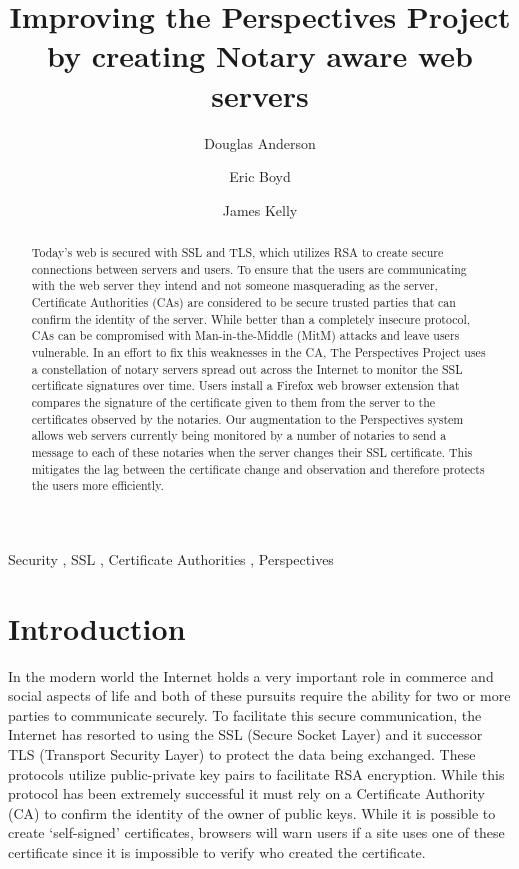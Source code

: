\documentclass[preprint,review,12pt]{elsarticle}
\begin{document}
\begin{frontmatter}

\title{Improving the Perspectives Project by creating Notary aware web servers}

\author[doug]{Douglas Anderson}
\author[eric]{Eric Boyd}
\author[james]{James Kelly}
\address[doug]{dander01@uoguelph.ca}
\address[eric]{boyde@uoguelph.ca}
\address[james]{kellyj@uoguelph.ca}


\begin{abstract}

Today's web is secured with SSL and TLS, which utilizes RSA to create secure
connections between servers and users. To ensure that the users are
communicating with the web server they intend and not someone masquerading as
the server, Certificate Authorities (CAs) are considered to be secure trusted
parties that can confirm the identity of the server. While better than a
completely insecure protocol, CAs can be compromised with Man-in-the-Middle
(MitM) attacks and leave users vulnerable. In an effort to fix this weaknesses
in the CA, The Perspectives Project uses a constellation of notary servers
spread out across the Internet to monitor the SSL certificate signatures over
time. Users install a Firefox web browser extension that compares the signature of the
certificate given to them from the server to the certificates observed by the
notaries. Our augmentation to the Perspectives system allows web servers
currently being monitored by a number of notaries to send a message to each of
these notaries when the server changes their SSL certificate. This mitigates
the lag between the certificate change and observation and therefore protects
the users more efficiently.

\end{abstract}

\begin{keyword}
Security \sep
SSL \sep
Certificate Authorities \sep
Perspectives
\end{keyword}

\end{frontmatter}

\section{Introduction}
\label{intro}

In the modern world the Internet holds a very important role in commerce and
social aspects of life and both of these pursuits require the ability for two
or more parties to communicate securely. To facilitate this secure
communication, the Internet has resorted to using the SSL (Secure Socket Layer)
and it successor TLS (Transport Security Layer) to protect the data being
exchanged.  These protocols utilize public-private key pairs to facilitate RSA
encryption.  While this protocol has been extremely successful it must rely on
a Certificate Authority (CA) to confirm the identity of the owner of public
keys. While it is possible to create `self-signed' certificates, browsers will
warn users if a site uses one of these certificate since it is impossible to
verify who created the certificate. 
\end{document}
